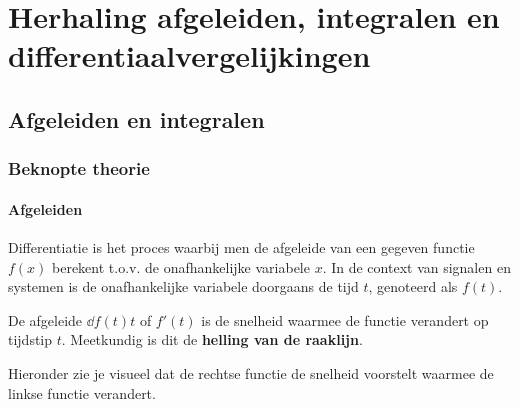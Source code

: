 \chapter{Herhaling afgeleiden, integralen en differentiaalvergelijkingen}
\label{ch:herhaling_afgeleiden_en_integralen}

\section{Afgeleiden en integralen}

\subsection{Beknopte theorie}

\subsubsection{Afgeleiden}

\begin{conceptbox}[Differentiatie]
Differentiatie is het proces waarbij men de afgeleide van een gegeven functie $f(x)$ berekent t.o.v. de onafhankelijke variabele $x$. In de context van signalen en systemen is de onafhankelijke variabele doorgaans de tijd $t$, genoteerd als $f(t)$.

De afgeleide $\dd{f(t)}{t}$ of $f'(t)$ is de snelheid waarmee de functie verandert op tijdstip $t$. Meetkundig is dit de \textbf{helling van de raaklijn}.
\end{conceptbox}

Hieronder zie je visueel dat de rechtse functie de snelheid voorstelt waarmee de linkse functie verandert.

\begin{center}
\begin{minipage}{0.45\textwidth}
\centering
{}
\end{minipage}
\hfill
\begin{minipage}{0.45\textwidth}
\centering
{}
\end{minipage}
\end{center}


